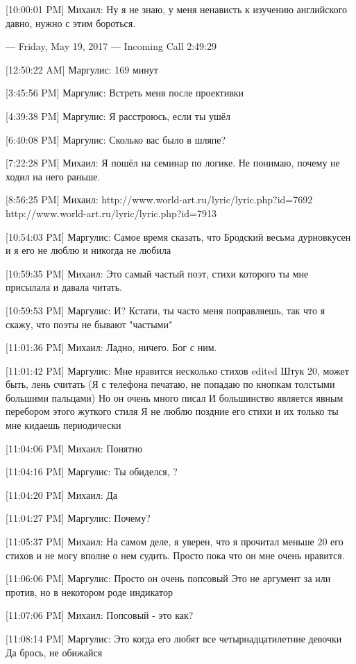 \documentclass{article}
\begin{document}
{[10:00:01 PM] Михаил:
Ну я не знаю, у меня ненависть к изучению английского давно, нужно с этим бороться.

--- Friday, May 19, 2017 ---
Incoming Call 2:49:29

[12:50:22 AM] Маргулис:
169 минут

[3:45:56 PM] Маргулис:
Встреть меня после проективки

[4:39:38 PM] Маргулис:
Я расстроюсь, если ты ушёл

[6:40:08 PM] Маргулис:
Сколько вас было в шляпе?

[7:22:28 PM] Михаил:
Я пошёл на семинар по логике. Не понимаю, почему не ходил на него раньше.

[8:56:25 PM] Михаил:
http://www.world-art.ru/lyric/lyric.php?id=7692
 http://www.world-art.ru/lyric/lyric.php?id=7913

[10:54:03 PM] Маргулис:
Самое время сказать, что Бродский весьма дурновкусен и я его не люблю и никогда не любила

[10:59:35 PM] Михаил:
Это самый частый поэт, стихи которого ты мне присылала и давала читать.

[10:59:53 PM] Маргулис:
И?
 Кстати, ты часто меня поправляешь, так что я скажу, что поэты не бывают "частыми"

[11:01:36 PM] Михаил:
Ладно, ничего. Бог с ним.

[11:01:42 PM] Маргулис:
Мне нравится несколько стихов
edited 
Штук 20, может быть, лень считать
 (Я с телефона печатаю, не попадаю по кнопкам толстыми большими пальцами)
 Но он очень много писал
 И большинство является явным перебором этого жуткого стиля
 Я не люблю поздние его стихи и их только ты мне кидаешь периодически

[11:04:06 PM] Михаил:
Понятно

[11:04:16 PM] Маргулис:
Ты обиделся,
 ?

[11:04:20 PM] Михаил:
Да

[11:04:27 PM] Маргулис:
Почему?

[11:05:37 PM] Михаил:
На самом деле, я уверен, что я прочитал меньше 20 его стихов и не могу вполне о нем судить. Просто пока что он мне очень нравится.

[11:06:06 PM] Маргулис:
Просто он очень попсовый
 Это не аргумент за или против, но в некотором роде индикатор

[11:07:06 PM] Михаил:
Попсовый - это как?

[11:08:14 PM] Маргулис:
Это когда его любят все четырнадцатилетние девочки
 Да брось, не обижайся

}
\end{document}
